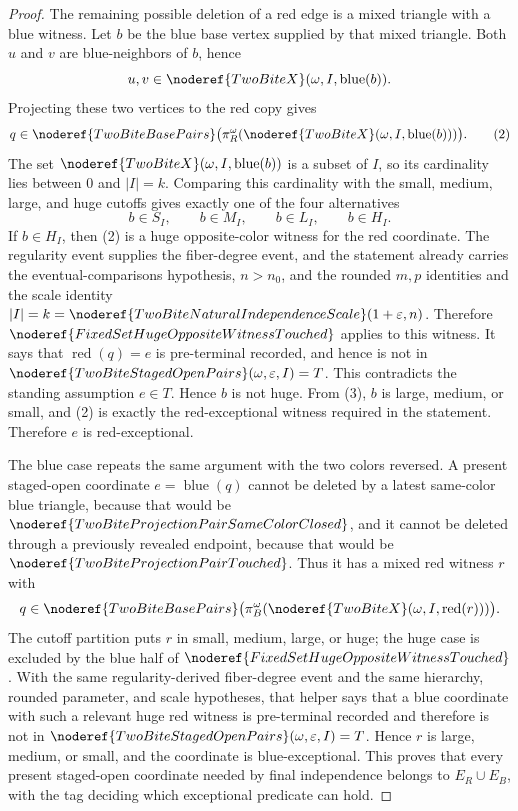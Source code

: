 \begin{proof}
The remaining possible deletion of a red edge is a mixed triangle with a blue
witness.  Let \(b\) be the blue base vertex supplied by that mixed triangle.
Both \(u\) and \(v\) are blue-neighbors of \(b\), hence
\[
u,v\in\noderef{TwoBiteX}(\omega,I,\operatorname{blue}(b)).
\]
Projecting these two vertices to the red copy gives
\[
q\in\noderef{TwoBiteBasePairs}
\bigl(\pi_R^\omega(\noderef{TwoBiteX}
(\omega,I,\operatorname{blue}(b)))\bigr). \tag{2}
\]
The set \(\noderef{TwoBiteX}(\omega,I,\operatorname{blue}(b))\) is a subset
of \(I\), so its cardinality lies between \(0\) and \(|I|=k\).  Comparing this
cardinality with the small, medium, large, and huge cutoffs gives exactly one
of the four alternatives
\[
b\in S_I,\qquad b\in M_I,\qquad b\in L_I,\qquad b\in H_I.
\tag{3}
\]
If \(b\in H_I\), then (2) is a huge opposite-color witness for the red
coordinate.  The regularity event supplies the fiber-degree event, and the
statement already carries the eventual-comparisons hypothesis, \(n>n_0\), and
the rounded \(m,p\) identities and the scale identity
\(|I|=k=\noderef{TwoBiteNaturalIndependenceScale}(1+\varepsilon,n)\).
Therefore
\(\noderef{FixedSetHugeOppositeWitnessTouched}\) applies to this witness.  It
says that \(\operatorname{red}(q)=e\) is pre-terminal recorded, and hence is
not in
\(\noderef{TwoBiteStagedOpenPairs}(\omega,\varepsilon,I)=T\).  This
contradicts the standing assumption \(e\in T\).  Hence \(b\) is not huge.
From (3), \(b\) is large, medium, or small, and (2) is exactly the
red-exceptional witness required in the statement.  Therefore \(e\) is
red-exceptional.

The blue case repeats the same argument with the two colors reversed.  A
present staged-open coordinate \(e=\operatorname{blue}(q)\) cannot be deleted
by a latest same-color blue triangle, because that would be
\(\noderef{TwoBiteProjectionPairSameColorClosed}\), and it cannot be deleted
through a previously revealed endpoint, because that would be
\(\noderef{TwoBiteProjectionPairTouched}\).  Thus it has a mixed red witness
\(r\) with
\[
q\in\noderef{TwoBiteBasePairs}
\bigl(\pi_B^\omega(\noderef{TwoBiteX}
(\omega,I,\operatorname{red}(r)))\bigr).
\]
The cutoff partition puts \(r\) in small, medium, large, or huge; the huge
case is excluded by the blue half of
\(\noderef{FixedSetHugeOppositeWitnessTouched}\).  With the same
regularity-derived fiber-degree event and the same hierarchy, rounded
parameter, and scale hypotheses, that helper says that a blue coordinate with
such a relevant huge red witness is pre-terminal recorded and therefore is
not in
\(\noderef{TwoBiteStagedOpenPairs}(\omega,\varepsilon,I)=T\).  Hence \(r\)
is large, medium, or small, and the coordinate is blue-exceptional.  This
proves that every present staged-open coordinate needed by final independence
belongs to \(E_R\cup E_B\), with the tag deciding which exceptional predicate
can hold.


\end{proof}
